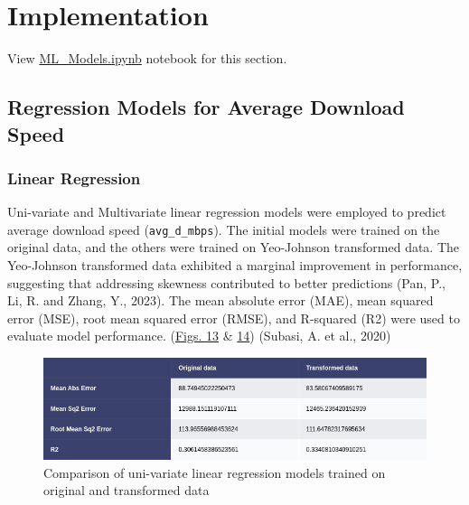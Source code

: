 \documentclass[
  letterpaper,
  DIV=11,
  numbers=noendperiod,
  oneside]{scrartcl}
\begin{document}
\hypertarget{implementation}{%
\section{Implementation}\label{implementation}}

\begin{tcolorbox}[enhanced jigsaw, title=\textcolor{quarto-callout-tip-color}{\faLightbulb}\hspace{0.5em}{Implementation Section Source Code}, toptitle=1mm, bottomtitle=1mm, bottomrule=.15mm, toprule=.15mm, colback=white, leftrule=.75mm, colframe=quarto-callout-tip-color-frame, colbacktitle=quarto-callout-tip-color!10!white, titlerule=0mm, opacitybacktitle=0.6, arc=.35mm, rightrule=.15mm, left=2mm, breakable, opacityback=0, coltitle=black]

View
\href{https://github.com/brandon-toews/data-analytics-assignment/blob/main/ML_Models.ipynb}{ML\_Models.ipynb}
notebook for this section.

\end{tcolorbox}

\hypertarget{regression-models-for-average-download-speed}{%
\subsection{Regression Models for Average Download
Speed}\label{regression-models-for-average-download-speed}}

\hypertarget{linear-regression}{%
\subsubsection{Linear Regression}\label{linear-regression}}

Uni-variate and Multivariate linear regression models were employed to
predict average download speed (\texttt{avg\_d\_mbps}). The initial
models were trained on the original data, and the others were trained on
Yeo-Johnson transformed data. The Yeo-Johnson transformed data exhibited
a marginal improvement in performance, suggesting that addressing
skewness contributed to better predictions (Pan, P., Li, R. and Zhang,
Y., 2023). The mean absolute error (MAE), mean squared error (MSE), root
mean squared error (RMSE), and R-squared (R2) were used to evaluate
model performance. (\protect\hyperlink{fig-uniresults}{Figs. 13} \&
\protect\hyperlink{fig-multiresults}{14}) (Subasi, A. et al., 2020)

\begin{figure}

{\centering \includegraphics{reg_t.png}

}

\caption{\label{fig-uniresults}Comparison of uni-variate linear
regression models trained on original and transformed data}

\end{figure}
\end{document}
